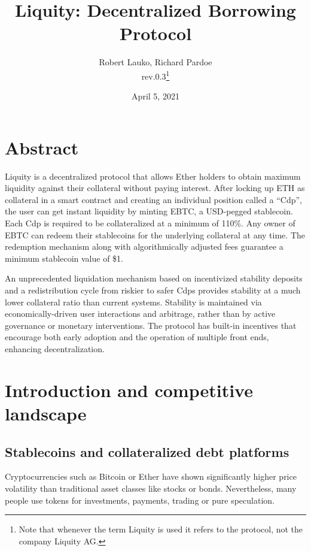\documentclass{article}
\begin{document}
\title{\textbf{Liquity: Decentralized Borrowing Protocol}}
\author{Robert Lauko, Richard Pardoe \\ rev.0.3\footnote{Note that whenever the term Liquity is used it refers to the protocol, not the company Liquity AG.}}
\date{April 5, 2021}

\maketitle

\section*{Abstract}
Liquity is a decentralized protocol that allows Ether holders to obtain maximum liquidity against their collateral without paying interest. After locking up ETH as collateral in a smart contract and creating an individual position called a “Cdp”, the user can get instant liquidity by minting EBTC, a USD-pegged stablecoin. Each Cdp is required to be collateralized at a minimum of 110\%. Any owner of EBTC can redeem their stablecoins for the underlying collateral at any time. The redemption mechanism along with algorithmically adjusted fees guarantee a minimum stablecoin value of \$1. 

An unprecedented liquidation mechanism based on incentivized stability deposits and a redistribution cycle from riskier to safer Cdps provides stability at a much lower collateral ratio than current systems. Stability is maintained via economically-driven user interactions and arbitrage, rather than by active governance or monetary interventions. 
The protocol has built-in incentives that encourage both early adoption and the operation of multiple front ends, enhancing decentralization.

\newpage

\tableofcontents

\section{Introduction and competitive landscape}

\subsection{Stablecoins and collateralized debt platforms}
Cryptocurrencies such as Bitcoin or Ether have shown significantly higher price volatility than traditional asset classes like stocks or bonds. Nevertheless, many people use tokens for investments, payments, trading or pure speculation.
\end{document}

